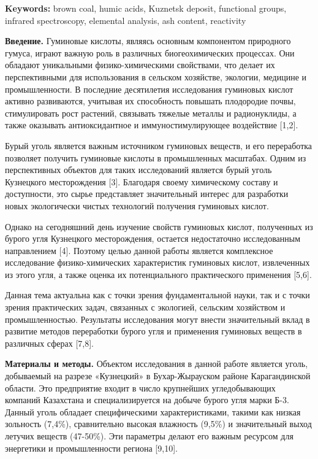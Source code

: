 {\bfseries Keywords:} brown coal, humic acids, Kuznetsk deposit, functional
groups, infrared spectroscopy, elemental analysis, ash content,
reactivity

{\bfseries Введение.} Гуминовые кислоты, являясь основным компонентом
природного гумуса, играют важную роль в различных биогеохимических
процессах. Они обладают уникальными физико-химическими свойствами, что
делает их перспективными для использования в сельском хозяйстве,
экологии, медицине и промышленности. В последние десятилетия
исследования гуминовых кислот активно развиваются, учитывая их
способность повышать плодородие почвы, стимулировать рост растений,
связывать тяжелые металлы и радионуклиды, а также оказывать
антиоксидантное и иммуностимулирующее воздействие {[}1,2{]}.

Бурый уголь является важным источником гуминовых веществ, и его
переработка позволяет получить гуминовые кислоты в промышленных
масштабах. Одним из перспективных объектов для таких исследований
является бурый уголь Кузнецкого месторождения {[}3{]}. Благодаря своему
химическому составу и доступности, это сырье представляет значительный
интерес для разработки новых экологически чистых технологий получения
гуминовых кислот.

Однако на сегодняшний день изучение свойств гуминовых кислот, полученных
из бурого угля Кузнецкого месторождения, остается недостаточно
исследованным направлением {[}4{]}. Поэтому целью данной работы является
комплексное исследование физико-химических характеристик гуминовых
кислот, извлеченных из этого угля, а также оценка их потенциального
практического применения {[}5,6{]}.

Данная тема актуальна как с точки зрения фундаментальной науки, так и с
точки зрения практических задач, связанных с экологией, сельским
хозяйством и промышленностью. Результаты исследования могут внести
значительный вклад в развитие методов переработки бурого угля и
применения гуминовых веществ в различных сферах {[}7,8{]}.

{\bfseries Материалы и методы.} Объектом исследования в данной работе
является уголь, добываемый на разрезе «Кузнецкий» в Бухар-Жырауском
районе Карагандинской области. Это предприятие входит в число крупнейших
угледобывающих компаний Казахстана и специализируется на добыче бурого
угля марки Б-3. Данный уголь обладает специфическими характеристиками,
такими как низкая зольность (7,4\%), сравнительно высокая влажность
(9,5\%) и значительный выход летучих веществ (47-50\%). Эти параметры
делают его важным ресурсом для энергетики и промышленности региона
{[}9,10{]}.

